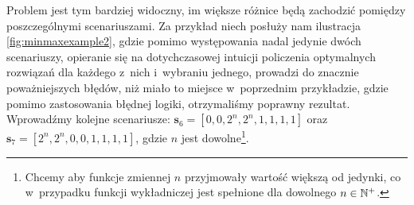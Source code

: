 Problem jest tym bardziej widoczny, im większe różnice będą zachodzić pomiędzy poszczególnymi scenariuszami.
Za przykład niech posłuży nam ilustracja \ref{fig:minmaxexample2}, gdzie pomimo występowania nadal jedynie dwóch scenariuszy, opieranie się na dotychczasowej intuicji policzenia optymalnych rozwiązań dla każdego z~nich i~wybraniu jednego, prowadzi do znacznie poważniejszych błędów, niż miało to miejsce w~poprzednim przykładzie, gdzie pomimo zastosowania błędnej logiki, otrzymaliśmy poprawny rezultat.
Wprowadźmy kolejne scenariusze: $\textbf{s}_{6} = \left[ 0, 0, 2^{n}, 2^{n}, 1, 1, 1, 1 \right]$ oraz $\textbf{s}_{7} = \left[ 2^{n}, 2^{n}, 0, 0, 1, 1, 1, 1 \right]$, gdzie $n$ jest dowolne\footnote{
	Chcemy aby funkcje zmiennej $n$ przyjmowały wartość większą od jedynki, co w~przypadku funkcji wykładniczej jest spełnione dla dowolnego $n \in \mathbb{N}^{+}$.
}.


